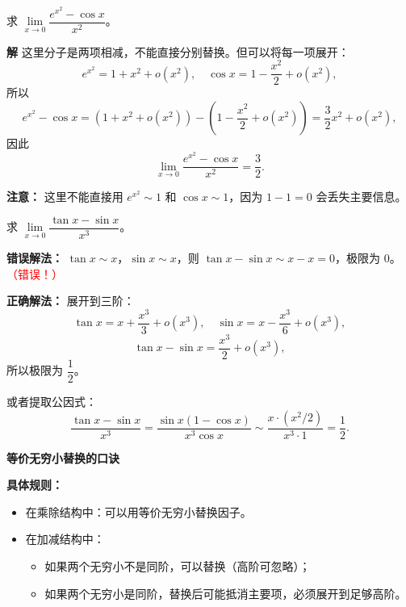 \documentclass{ctexart}
\newenvironment{custom}[1]{\par\noindent \textbf{#1}\quad}{\par\vspace{1em}}
\begin{document}
\begin{example}[乘除结构中的复杂替换]
求 \(\lim\limits_{x \to 0} \dfrac{e^{x^2} - \cos x}{x^2}\)。
\end{example}
\begin{custom}{解}
这里分子是两项相减，不能直接分别替换。但可以将每一项展开：
\[
e^{x^2} = 1 + x^2 + o(x^2),\quad \cos x = 1 - \dfrac{x^2}{2} + o(x^2),
\]
所以
\[
e^{x^2} - \cos x = \left(1 + x^2 + o(x^2)\right) - \left(1 - \dfrac{x^2}{2} + o(x^2)\right) = \dfrac{3}{2}x^2 + o(x^2),
\]
因此
\[
\lim_{x \to 0} \dfrac{e^{x^2} - \cos x}{x^2} = \dfrac{3}{2}.
\]

\textbf{注意：} 这里不能直接用 \(e^{x^2} \sim 1\) 和 \(\cos x \sim 1\)，因为 \(1-1=0\) 会丢失主要信息。
\end{custom}

\begin{example}[加减结构中的错误示例]
求 \(\lim\limits_{x \to 0} \dfrac{\tan x - \sin x}{x^3}\)。

\textbf{错误解法：} \(\tan x \sim x\)，\(\sin x \sim x\)，则 \(\tan x - \sin x \sim x - x = 0\)，极限为 0。\textcolor{red}{（错误！）}

\textbf{正确解法：} 展开到三阶：
\[
\tan x = x + \dfrac{x^3}{3} + o(x^3),\quad \sin x = x - \dfrac{x^3}{6} + o(x^3),
\]
\[
\tan x - \sin x = \dfrac{x^3}{2} + o(x^3),
\]
所以极限为 \(\dfrac{1}{2}\)。

或者提取公因式：
\[
\dfrac{\tan x - \sin x}{x^3} = \dfrac{\sin x(1 - \cos x)}{x^3 \cos x} \sim \dfrac{x \cdot (x^2/2)}{x^3 \cdot 1} = \dfrac{1}{2}.
\]
\end{custom}

\begin{custom}{等价无穷小替换的口诀}
\begin{center}
\end{center}

\textbf{具体规则：}
\begin{itemize}
\item 在乘除结构中：可以用等价无穷小替换因子。
\item 在加减结构中：
  \begin{itemize}
    \item 如果两个无穷小不是同阶，可以替换（高阶可忽略）；
    \item 如果两个无穷小是同阶，替换后可能抵消主要项，必须展开到足够高阶。
  \end{itemize}
\end{itemize}
\end{custom}


\end{example}
\end{document}

